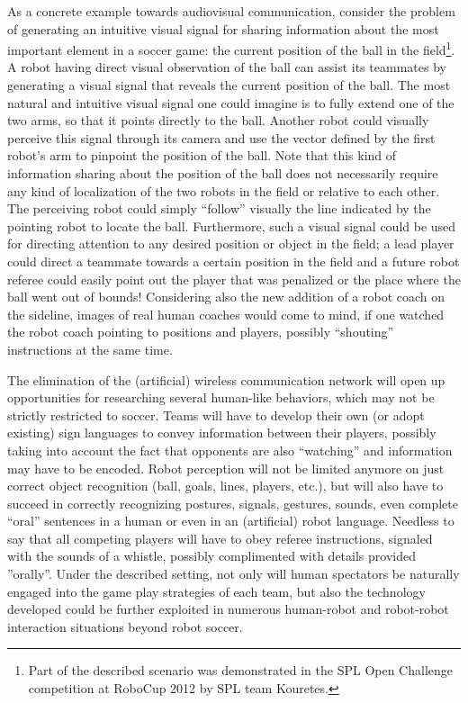 \documentclass{llncs}
\begin{document}
As a concrete example towards audiovisual communication, consider the problem of generating 
an intuitive visual signal for sharing information about the most important element in a 
soccer game: the current position of the ball in the field\footnote{Part of the described 
scenario was demonstrated in the SPL Open Challenge competition at RoboCup 2012 by SPL team 
Kouretes.}. A robot having direct visual observation of the ball can assist its teammates by 
generating a visual signal that reveals the current position of the ball. The most natural 
and intuitive visual signal one could imagine is to fully extend one of the two arms, so that 
it points directly to the ball. Another robot could visually perceive this signal through its 
camera and use the vector defined by the first robot's arm to pinpoint the position of the 
ball. Note that this kind of information sharing about the position of the ball does not 
necessarily require any kind of localization of the two robots in the field or relative to 
each other. The perceiving robot could simply ``follow'' visually the line indicated by the 
pointing robot to locate the ball. Furthermore, such a visual signal could be used for 
directing attention to any desired position or object in the field; a lead player could 
direct a teammate towards a certain position in the field and a future robot referee could 
easily point out the player that was penalized or the place where the ball went out of 
bounds! Considering also the new addition of a robot coach on the sideline, images of real 
human coaches would come to mind, if one watched the robot coach pointing to positions and 
players, possibly ``shouting'' instructions at the same time. 

The elimination of the (artificial) wireless communication network will open up opportunities 
for researching several human-like behaviors, which may not be strictly restricted to soccer. 
Teams will have to develop their own (or adopt existing) sign languages to convey information 
between their players, possibly taking into account the fact that opponents are also 
``watching'' and information may have to be encoded. Robot perception will not be limited 
anymore on just correct object recognition (ball, goals, lines, players, etc.), but will also 
have to succeed in correctly recognizing postures, signals, gestures, sounds, even complete 
``oral'' sentences in a human or even in an (artificial) robot language. Needless to say that 
all competing players will have to obey referee instructions, signaled with the sounds of a 
whistle, possibly complimented with details provided ''orally''. Under the described setting, 
not only will human spectators be naturally engaged into the game play strategies of each 
team, but also the technology developed could be further exploited in numerous human-robot 
and robot-robot interaction situations beyond robot soccer. 
\end{document}

